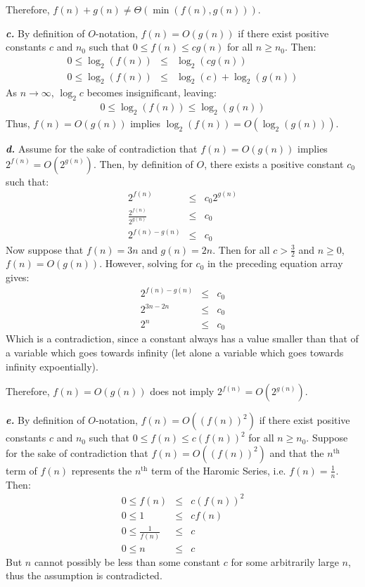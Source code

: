 \documentclass{article}
\begin{document}
Therefore, $f(n) + g(n) \neq \Theta(\min(f(n),g(n)))$.

\noindent\textbf{\textit{c.}} By definition of $O$-notation,  $f(n) = O(g(n))$ if there exist positive constants $c$ and $n_0$ such that $0 \leq f(n) \leq c g(n)$ for all $n \geq n_0$. Then:
\begin{eqnarray*}
	0 \leq \log_2(f(n)) & \leq & \log_2(c g(n)) \\
	0 \leq \log_2(f(n)) & \leq & \log_2(c) + \log_2(g(n))
\end{eqnarray*}
As $n \rightarrow \infty$, $\log_2 c$ becomes insignificant, leaving:
\begin{eqnarray*}
	0 \leq \log_2(f(n)) \leq \log_2(g(n))
\end{eqnarray*}
Thus, $f(n) = O(g(n))$ implies $\log_2(f(n)) = O(\log_2(g(n)))$.

\noindent\textbf{\textit{d.}} Assume for the sake of contradiction that $f(n) = O(g(n))$ implies $ 2^{f(n)} = O(2^{g(n)})$. Then, by definition of $O$, there exists a positive constant $c_0$ such that:
\begin{eqnarray*}
	2^{f(n)} & \leq & c_0 2^{g(n)} \\
	\frac{2^{f(n)}}{2^{g(n)}} & \leq & c_0 \\
	2^{f(n) - g(n)} & \leq & c_0
\end{eqnarray*}
Now suppose that $f(n) = 3n$ and $g(n) = 2n$. Then for all $c > \frac{3}{2}$ and $n \geq 0$, $f(n) = O(g(n))$. However, solving for $c_0$ in the preceding equation array gives:
\begin{eqnarray*}
	2^{f(n) - g(n)} & \leq & c_0 \\
	2^{3n - 2n} & \leq & c_0 \\
	2^n & \leq & c_0
\end{eqnarray*}
Which is a contradiction, since a constant always has a value smaller than that of a variable which goes towards infinity (let alone a variable which goes towards infinity expoentially).

Therefore, $f(n) = O(g(n))$ does not imply $2^{f(n)} = O(2^{g(n)})$.

\noindent\textbf{\textit{e.}} By definition of $O$-notation, $f(n) = O((f(n))^2)$ if there exist positive constants $c$ and $n_0$ such that $0 \leq f(n) \leq c (f(n))^2$ for all $n \geq n_0$. Suppose for the sake of contradiction that $f(n) = O((f(n))^2)$ and that the $n^{\text{th}}$ term of $f(n)$ represents the $n^{\text{th}}$ term of the Haromic Series, i.e. $f(n) = \frac{1}{n}$. Then:
\begin{eqnarray*}
	0 \leq f(n) & \leq & c (f(n))^2 \\
	0 \leq 1 & \leq & c f(n) \\
	0 \leq \frac{1}{f(n)} & \leq & c \\
	0 \leq n & \leq & c
\end{eqnarray*}
But $n$ cannot possibly be less than some constant $c$ for some arbitrarily large $n$, thus the assumption is contradicted.
\end{document}
